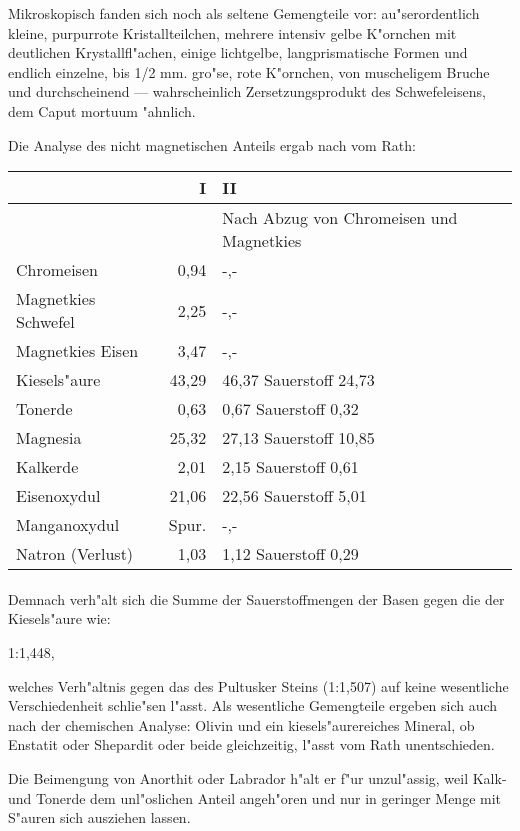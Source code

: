 \documentclass[a4paper, 11pt, oneside]{article}
\begin{document}
Mikroskopisch fanden sich noch als seltene Gemengteile vor: au"serordentlich kleine, purpurrote Kristallteilchen, mehrere intensiv gelbe K"ornchen mit deutlichen Krystallfl"achen, einige lichtgelbe, langprismatische Formen und endlich einzelne, bis 1/2 mm. gro"se, rote K"ornchen, von muscheligem Bruche und durchscheinend --- wahrscheinlich Zersetzungsprodukt des Schwefeleisens, dem Caput mortuum "ahnlich.

Die Analyse des nicht magnetischen Anteils ergab nach vom Rath:
\begin{center}
    \begin{tabular}{ |l|r|p{50mm}| }
    \hline
    & I & II\\\hline
    & & Nach Abzug von Chromeisen und Magnetkies\\
    \hline\hline
    Chromeisen & 0,94 & -,-\\\hline
    Magnetkies Schwefel & 2,25 & -,-\\\hline
    Magnetkies Eisen & 3,47 & -,-\\\hline
    Kiesels"aure & 43,29 & 46,37 Sauerstoff 24,73\\\hline
    Tonerde & 0,63 & 0,67 Sauerstoff 0,32\\\hline
    Magnesia & 25,32 & 27,13 Sauerstoff 10,85\\\hline
    Kalkerde & 2,01 & 2,15 Sauerstoff 0,61\\\hline
    Eisenoxydul & 21,06 & 22,56 Sauerstoff 5,01\\\hline
    Manganoxydul & Spur. & -,-\\\hline
    Natron (Verlust) & 1,03 & 1,12 Sauerstoff 0,29\\
    \hline
    \end{tabular}
\end{center}
\paragraph{}
Demnach verh"alt sich die Summe der Sauerstoffmengen der Basen gegen die der Kiesels"aure wie:

1:1,448,

welches Verh"altnis gegen das des Pultusker Steins (1:1,507) auf keine wesentliche Verschiedenheit schlie"sen l"asst. Als wesentliche Gemengteile ergeben sich auch nach der chemischen Analyse: Olivin und ein kiesels"aurereiches Mineral, ob Enstatit oder Shepardit oder beide gleichzeitig, l"asst vom Rath unentschieden.

Die Beimengung von Anorthit oder Labrador h"alt er f"ur unzul"assig, weil Kalk- und Tonerde dem unl"oslichen Anteil angeh"oren und nur in geringer Menge mit S"auren sich ausziehen lassen.
\end{document}
